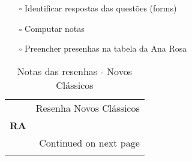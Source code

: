\documentclass[11pt]{article}
\begin{document}
\begin{itemize}
\item[{$\square$}] Identificar respostas das questões (forms)
\item[{$\square$}] Computar notas
\item[{$\square$}] Preencher presenhas na tabela da Ana Rosa
\end{itemize}
\begin{center}
\begin{longtable}{lr}
\caption{Notas das resenhas - Novos Clássicos}\\
\toprule
{} &  Resenha Novos Clássicos \\
\textbf{RA    } &                          \\
\midrule
\endhead
\midrule
\multicolumn{2}{r}{{Continued on next page}} \\
\midrule
\endfoot


\end{longtable}
\end{center}
\end{document}
